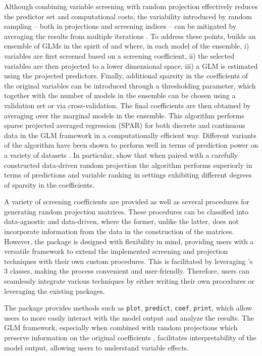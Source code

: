 \documentclass[
  article]{jss}
\begin{document}
Although combining variable screening with random projection effectively
reduces the predictor set and computational costs, the variability
introduced by random sampling -- both in projections and screening
indices -- can be mitigated by averaging the results from multiple
iterations \citep{Thanei2017RPforHDR}. To address these points,
 builds an ensemble of GLMs in the spirit of
\citet{Dunson2020TargRandProj} and \citet{parzer2024glms} where, in each
model of the ensemble, i) variables are first screened based on a
screening coefficient, ii) the selected variables are then projected to
a lower dimensional space, iii) a GLM is estimated using the projected
predictors. Finally, additional sparsity in the coefficients of the
original variables can be introduced through a thresholding parameter,
which together with the number of models in the ensemble can be chosen
using a validation set or via cross-validation. The final coefficients
are then obtained by averaging over the marginal models in the ensemble.
This algorithm performs sparse projected averaged regression (SPAR) for
both discrete and continuous data in the GLM framework in a
computationally efficient way. Different variants of the algorithm have
been shown to perform well in terms of prediction power on a variety of
datasets \citep[see][]{Dunson2020TargRandProj}. In particular,
\citet{parzer2024glms} show that when paired with a carefully
constructed data-driven random projection the algorithm performs
superiorly in terms of predictions and variable ranking in settings
exhibiting different degrees of sparsity in the coefficients.

A variety of screening coefficients are provided as well as several
procedures for generating random projection matrices. These procedures
can be classified into data-agnostic and data-driven, where the former,
unlike the latter, does not incorporate information from the data in the
construction of the matrices. However, the package is designed with
flexibility in mind, providing users with a versatile framework to
extend the implemented screening and projection techniques with their
own custom procedures. This is facilitated by leveraging 's
3 classes, making the process convenient and user-friendly.
Therefore, users can seamlessly integrate various techniques by either
writing their own procedures or leveraging the existing 
packages.

The package provides methods such as \texttt{plot}, \texttt{predict},
\texttt{coef}, \texttt{print}, which allow users to more easily interact
with the model output and analyze the results. The GLM framework,
especially when combined with random projections which preserve
information on the original coefficients \citep[such as the one
in][]{parzer2024glms}, facilitates interpretability of the model output,
allowing users to understand variable effects.
\end{document}
